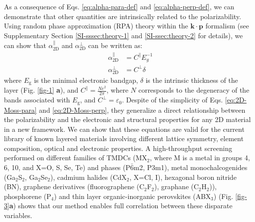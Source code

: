 \documentclass[journal=ancac3,manuscript=article,email=true,hyperref=true,keywords=false]{achemso}
\begin{document}
As a consequence of Eqs. \ref{eq:alpha-para-def} and \ref{eq:alpha-perp-def}, we can demonstrate 
that other quantities are intrinsically related to the polarizability. 
Using random phase approximation (RPA)
theory \cite{Adler_1962} within the $\mathbf{k} \cdot \mathbf{p}$
formalism\cite{kittel_2005_introduction} (see Supplementary
Section \ref{SI-sssec:theory-1} and  \ref{SI-ssec:theory-2} for details), 
we can show that
$\alpha_{\mathrm{2D}}^{\parallel}$ and $\alpha_{\mathrm{2D}}^{\perp}$
can be written as: 
%
%
%
\begin{subequations}
\begin{eqnarray}
\label{eq:2D-Moss-para}
  &\alpha_{\mathrm{2D}}^{\parallel} &=C^{\parallel} E_{g}^{-1} \\
  \label{eq:2D-Moss-perp}
  &\alpha_{\mathrm{2D}}^{\perp} & =C^{\perp} \delta
\end{eqnarray}
\end{subequations}
%
%
%
%
where $E_{\mathrm{g}}$ is the minimal electronic bandgap, $\delta$ is
the intrinsic thickness of the layer (Fig. \ref{fig-1}{\bf
  a}), and $C^{\parallel} = \frac{Ne^2}{2 \pi}$, where $N$ corresponds to
the degeneracy of the bands associated with $E_{\mathrm{g}}$, and
$C^{\perp} = {\varepsilon_{0}}$.   Despite of the simplicity of Eqs. \ref{eq:2D-Moss-para} and
\ref{eq:2D-Moss-perp}, they generalize a direct relationship between
the polarizability and the electronic and structural properties for
any 2D material in a new framework.  We can show that these equations
are valid for the current library of known layered materials involving
different lattice symmetry, element composition, optical and
electronic properties.
%
A high-throughput screening performed on 
different families of TMDCs (MX\(_{\text{2}}\), where M is
a metal in groups 4, 6, 10, and X=O, S, Se, Te) and phases (P\(\bar{6}\)m2, P3m1), 
metal monochalcogenides
(Ga$_{2}$S$_{2}$, Ga$_{2}$Se$_{2}$), cadmium halides (CdX$_2$, X=Cl,
I), hexagonal boron nitride (BN), graphene derivatives (fluorographene
(C$_{2}$F$_{2}$), graphane (C$_{2}$H$_{2}$)), phosphorene (P$_{4}$)
and thin layer organic-inorganic perovskites (ABX$_{3}$) (Fig. \ref{fig-3}{\bf a}) 
shows that our method enables full correlation between these disparate variables. 
%
%
\end{document}

